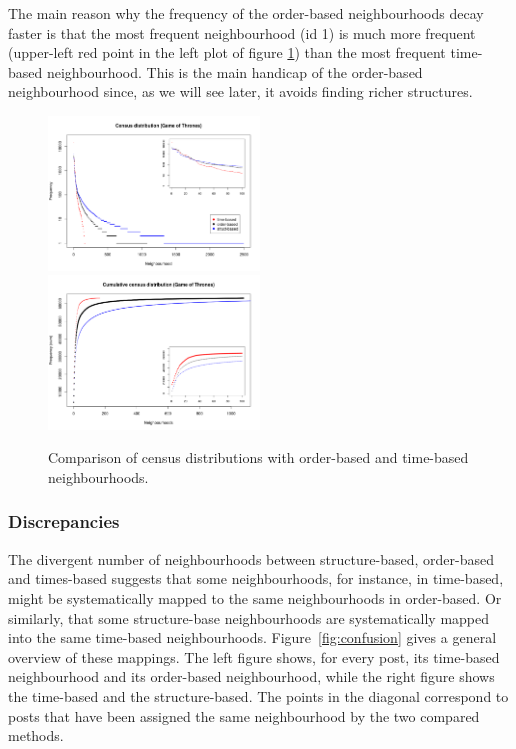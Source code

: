 \documentclass[conference]{IEEEtran}
\begin{document}
The main reason why the frequency of the order-based neighbourhoods decay faster is that the most frequent neighbourhood (id 1) is much more frequent (upper-left red point in the left plot of figure \ref{fig:census_distributions}) than the most frequent time-based neighbourhood. This is the main handicap of the order-based neighbourhood since, as we will see later, it avoids finding richer structures.

\begin{figure}
\centering
\includegraphics[width=0.5\textwidth]{compare_census_distribution_gameofthones}%
\includegraphics[width=0.5\textwidth]{compare_census_distribution_gameofthones_cum}
\caption{Comparison of census distributions with order-based and time-based neighbourhoods.}
\label{fig:census_distributions}
\end{figure}

\subsubsection{Discrepancies}
The divergent number of neighbourhoods between structure-based, order-based and times-based suggests that some neighbourhoods, for instance, in time-based, might be systematically mapped to the same neighbourhoods in order-based. Or similarly, that some structure-base neighbourhoods are systematically mapped into the same time-based neighbourhoods. Figure~\ref{fig:confusion} gives a general overview of these mappings. The left figure shows, for every post, its time-based neighbourhood and its order-based neighbourhood, while the right figure shows the time-based and the structure-based. The points in the diagonal correspond to posts that have been assigned the same neighbourhood by the two compared methods. 
\end{document}
